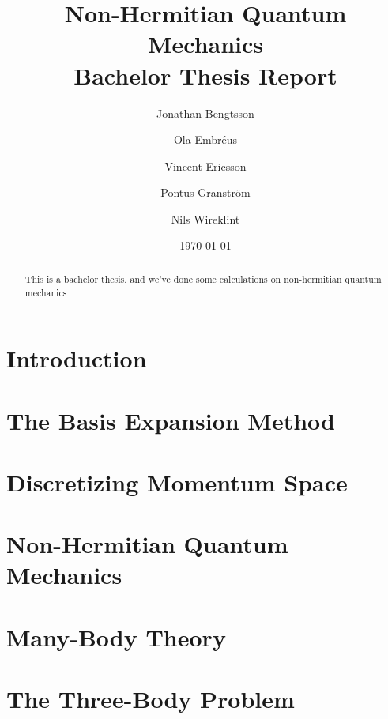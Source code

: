 \documentclass[12pt,a4paper]{report}
\begin{document}
  


\title{Non-Hermitian Quantum Mechanics\\
\Large Bachelor Thesis Report}
\author{Jonathan Bengtsson  \and Ola Embréus \and Vincent Ericsson \and Pontus Granström \and Nils Wireklint}
\date{\today}



\maketitle

\newpage
\begin{abstract}
This is a bachelor thesis, and we've done some calculations on non-hermitian quantum mechanics 
\end{abstract}
\newpage

\tableofcontents

\newpage

\chapter{Introduction}
\label{cha:introduction}



\chapter{The Basis Expansion Method}
\label{cha:basis_expansion}



\chapter{Discretizing Momentum Space}
\label{cha:mom_space}



\chapter{Non-Hermitian Quantum Mechanics} 
\label{cha:nhqm}


\chapter{Many-Body Theory}
\label{cha:many_body}




\chapter{The Three-Body Problem}
\label{cha:three_body}
\end{document}
